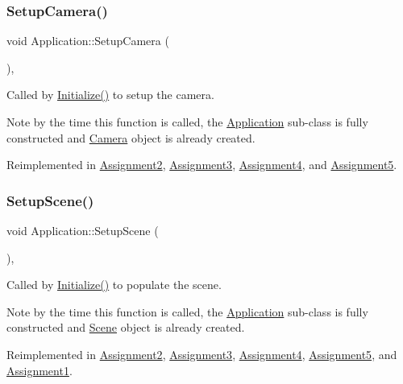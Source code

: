 \subsubsection{\texorpdfstring{Setup\+Camera()}{SetupCamera()}}
{\footnotesize\ttfamily void Application\+::\+Setup\+Camera (\begin{DoxyParamCaption}{ }\end{DoxyParamCaption})\hspace{0.3cm}{\ttfamily [private]}, {\ttfamily [virtual]}}



Called by \hyperlink{class_application_a17cf1ea4552d26a1c20f7d98d793d41d}{Initialize()} to setup the camera. 

Note by the time this function is called, the \hyperlink{class_application}{Application} sub-\/class is fully constructed and \hyperlink{class_camera}{Camera} object is already created. 

Reimplemented in \hyperlink{class_assignment2_ab9ace1ffdac8f7425c64d661f3d13acd}{Assignment2}, \hyperlink{class_assignment3_a1d23eb19973b78e516169f4a03954526}{Assignment3}, \hyperlink{class_assignment4_aa2bc15adb48cf54e477fce0c686cf2f0}{Assignment4}, and \hyperlink{class_assignment5_a0c49123e133adfb36c769c943eae42fa}{Assignment5}.

\hypertarget{class_application_aa8e8017ef8dd86293c96d0645e66d440}{}\label{class_application_aa8e8017ef8dd86293c96d0645e66d440} 
\subsubsection{\texorpdfstring{Setup\+Scene()}{SetupScene()}}
{\footnotesize\ttfamily void Application\+::\+Setup\+Scene (\begin{DoxyParamCaption}{ }\end{DoxyParamCaption})\hspace{0.3cm}{\ttfamily [private]}, {\ttfamily [virtual]}}



Called by \hyperlink{class_application_a17cf1ea4552d26a1c20f7d98d793d41d}{Initialize()} to populate the scene. 

Note by the time this function is called, the \hyperlink{class_application}{Application} sub-\/class is fully constructed and \hyperlink{class_scene}{Scene} object is already created. 

Reimplemented in \hyperlink{class_assignment2_aa4f8ccd09a7accbdf093394c6ee4f63f}{Assignment2}, \hyperlink{class_assignment3_a2dc29d9016a9d822ede84b9ef41429a5}{Assignment3}, \hyperlink{class_assignment4_a38c50647bb65ff03aaf293fcc21dc5fd}{Assignment4}, \hyperlink{class_assignment5_a43328e09e6241ae6c62a9b7be7659b3b}{Assignment5}, and \hyperlink{class_assignment1_a8d12cf21f1463caa5a8da45110b50103}{Assignment1}.

